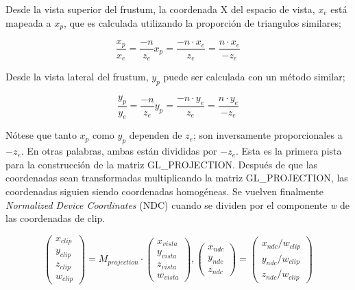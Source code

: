 Desde la vista superior del frustum, la coordenada X del espacio de vista, $x_e$ está mapeada a $x_p$, que es calculada utilizando la proporción de triangulos similares;
\begin{figure} [h]
  \centering
  \[
  \frac{x_p}{x_e} = \frac{-n}{z_e}
  x_p = \frac{-n \cdot x_e}{z_e} = \frac{n \cdot x_e}{-z_e}
  \]
\end{figure}

Desde la vista lateral del frustum, $y_p$ puede ser calculada con un método similar;

\begin{figure} [h]
  \centering
  \[ \frac{y_p}{y_e} = \frac{-n}{z_e}
  y_p = \frac{-n \cdot y_e}{z_e} = \frac{n \cdot y_e}{-z_e} \]
\end{figure}

\newpage
{}
Nótese que tanto $x_p$ como $y_p$ dependen de $z_e$; son inversamente proporcionales a $-z_e$. En otras palabras, ambas están divididas por $-z_e$. Esta es la primera pista para la construcción de la matriz GL\_PROJECTION. Después de que las coordenadas sean transformadas multiplicando la matriz GL\_PROJECTION, las coordenadas siguien siendo coordenadas homogéneas. Se vuelven finalmente \textit{Normalized Device Coordinates} (NDC) cuando se dividen por el componente \textit{w} de las coordenadas de clip.

\begin{figure} [h]
  \centering
  \[
  \begin{pmatrix}
    x_{clip} \\ y_{clip} \\ z_{clip} \\ w_{clip}
  \end{pmatrix}
  =
  M_{projection} \cdot
  \begin{pmatrix}
    x_{vista} \\ y_{vista} \\ z_{vista} \\ w_{vista}
  \end{pmatrix} ,
  \begin{pmatrix}
    x_{ndc} \\ y_{ndc} \\ z_{ndc}
  \end{pmatrix}
  =
  \begin{pmatrix}
    x_{ndc}/w_{clip} \\ y_{ndc}/w_{clip} \\ z_{ndc}/w_{clip}
  \end{pmatrix}
  \]
\end{figure}


